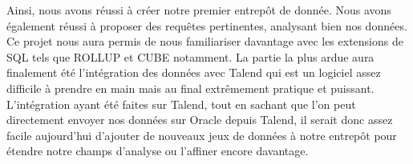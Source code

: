 \documentclass[a4paper,sffamily,12pt]{article}
\begin{document}
		\vspace{0.5cm}
		
		Ainsi, nous avons réussi à créer notre premier entrepôt de donnée. Nous avons également réussi à proposer des requêtes pertinentes, analysant bien nos données. Ce projet nous aura permis de nous familiariser davantage avec les extensions de SQL tels que ROLLUP et CUBE notamment. La partie la plus ardue aura finalement été l'intégration des données avec Talend qui est un logiciel assez difficile à prendre en main mais au final extrêmement pratique et puissant. L'intégration ayant été faites sur Talend, tout en sachant que l'on peut directement envoyer nos données sur Oracle depuis Talend, il serait donc assez facile aujourd'hui d'ajouter de nouveaux jeux de données à notre entrepôt pour étendre notre champs d'analyse ou l'affiner encore davantage. \\
						
\end{document}
